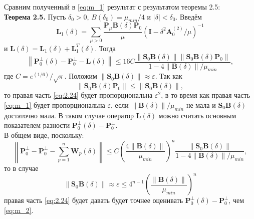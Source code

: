 \documentclass[fleqn]{article}
\newcommand\norm[1]{\left\|#1\right\|}
\renewcommand\b[1]{\mathbf{#1}}
\begin{document}
	Сравним полученный в \eqref{eq:m_1} результат с результатом теоремы 2.5:
	\vspace*{\baselineskip}\\
	\textbf{Теорема 2.5.} Пусть $\delta_0>0,\,B(\delta_0)=\mu_{min}/4$ и $|\delta| < \delta_0$. Введём
	\begin{equation}
		\textbf{L}_1(\delta)=\sum_{\mu>0}\dfrac{\textbf{P}_\mu\textbf{B}(\delta)\textbf{P}_0}{\mu}\left(\textbf{I}-\delta^2\textbf{A}_0^{(2)}/\mu\right)^{-1}
	\end{equation}
	и $\textbf{L}(\delta) = \textbf{L}_1(\delta)+\textbf{L}_1^T(\delta)$. Тогда
	\begin{equation}\label{eq:2.24}
		\norm{\b{P}_0^\bot(\delta) - \b{P}_0^\bot - \textbf{L}(\delta)} \leqslant 16C\dfrac{\norm{\textbf{S}_0\textbf{B}(\delta)}\norm{\textbf{S}_0\textbf{B}(\delta)\textbf{P}_0}}{1-4\norm{\textbf{B}(\delta)}/\mu_{min}},
	\end{equation}
	где $C = e^{(1/6)}/\sqrt{\pi}$.
	Положим $\norm{\textbf{S}_0\textbf{B}(\delta)}\approx\varepsilon$. Так как
	\begin{equation*}
		\norm{\textbf{S}_0\textbf{B}(\delta)\textbf{P}_0}\leqslant\norm{\textbf{S}_0\textbf{B}(\delta)},
	\end{equation*}
	то правая часть \eqref{eq:2.24} будет пропорциональна $\varepsilon^2$, в то время как правая часть \eqref{eq:m_1} будет пропорциональна $\varepsilon$, если $\norm{\textbf{B}(\delta)}/\mu_{min}$ не мала и $\textbf{S}_0\textbf{B}(\delta)$ достаточно мала. В таком случае оператор $\textbf{L}(\delta)$ можно считать основным показателем разности $\textbf{P}_0^\bot(\delta)-\textbf{P}_0^\bot$.\\
	В общем виде, поскольку:
	\begin{equation*}
		\norm{\b{P}_0^\bot - \b{P}_0^\bot - \sum\limits^n_{p=1}\b{W}_p(\delta)} \leqslant C\left(\dfrac{4\norm{\b{B}(\delta)}}{\mu_{min}}\right)^n\dfrac{\norm{\textbf{S}_0\textbf{B}(\delta)}}{1-4\norm{\b{B}(\delta)}/\mu_{min}},
	\end{equation*}
	то в случае
	\begin{equation*}
		\norm{\textbf{S}_0\textbf{B}(\delta)}\approx\varepsilon\leqslant4^{n-1}\left(\dfrac{\norm{\b{B}(\delta)}}{\mu_{min}}\right)^n
	\end{equation*}
	правая часть \eqref{eq:2.24} будет давать будет точнее оценивать $\textbf{P}_0^\bot(\delta)-\textbf{P}_0^\bot$, чем \eqref{eq:m_2}.
	
	
\end{document}
